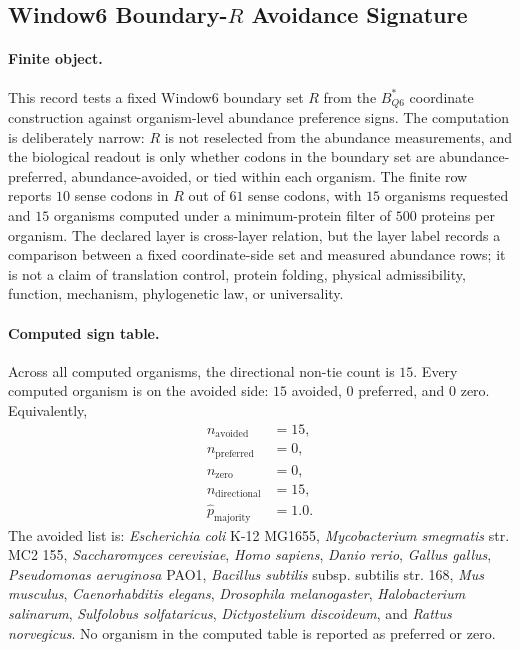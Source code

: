 \subsection{Window6 Boundary-$R$ Avoidance Signature}\label{sec:bioreality-window6-boundary-r-avoidance}

\paragraph{Finite object.}
This record tests a fixed Window6 boundary set $R$ from the $B^*_{Q6}$ coordinate construction against organism-level abundance preference signs.  The computation is deliberately narrow: $R$ is not reselected from the abundance measurements, and the biological readout is only whether codons in the boundary set are abundance-preferred, abundance-avoided, or tied within each organism.  The finite row reports $10$ sense codons in $R$ out of $61$ sense codons, with $15$ organisms requested and $15$ organisms computed under a minimum-protein filter of $500$ proteins per organism.  The declared layer is cross-layer relation, but the layer label records a comparison between a fixed coordinate-side set and measured abundance rows; it is not a claim of translation control, protein folding, physical admissibility, function, mechanism, phylogenetic law, or universality.

\paragraph{Computed sign table.}
Across all computed organisms, the directional non-tie count is $15$.  Every computed organism is on the avoided side: $15$ avoided, $0$ preferred, and $0$ zero.  Equivalently,
$$
\begin{aligned}
 n_{\mathrm{avoided}} &= 15,\\
 n_{\mathrm{preferred}} &= 0,\\
 n_{\mathrm{zero}} &= 0,\\
 n_{\mathrm{directional}} &= 15,\\
 \widehat p_{\mathrm{majority}} &= 1.0.
\end{aligned}
$$
The avoided list is: \emph{Escherichia coli} K-12 MG1655, \emph{Mycobacterium smegmatis} str. MC2 155, \emph{Saccharomyces cerevisiae}, \emph{Homo sapiens}, \emph{Danio rerio}, \emph{Gallus gallus}, \emph{Pseudomonas aeruginosa} PAO1, \emph{Bacillus subtilis} subsp. subtilis str. 168, \emph{Mus musculus}, \emph{Caenorhabditis elegans}, \emph{Drosophila melanogaster}, \emph{Halobacterium salinarum}, \emph{Sulfolobus solfataricus}, \emph{Dictyostelium discoideum}, and \emph{Rattus norvegicus}.  No organism in the computed table is reported as preferred or zero.

